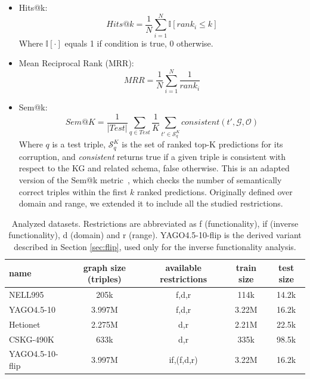 \documentclass[a4paper,UKenglish,cleveref, autoref, thm-restate]{tgdk-v2021}
\begin{document}
\begin{itemize}
    \item Hits@k: 
    \[
    \textit{Hits@}k = \frac{1}{N} \sum_{i=1}^{N} \mathbb{I} \left[ \textit{rank}_i \leq k \right]
    \]
    Where $\mathbb{I}[\cdot]$ equals 1 if condition is true, 0 otherwise.
    \item Mean Reciprocal Rank (MRR): 
    \[
    \textit{MRR} = \frac{1}{N} \sum_{i=1}^{N} \frac{1}{\textit{rank}_i}
    \]
     \item Sem@k:
    \[\textit{Sem}@K = \frac{1}{|\textit{Test}|} \sum_{q \in \textit{Test}} \frac{1}{K} \sum_{t' \in \mathcal{S}_q^K} \textit{consistent}(t',\mathcal{G},\mathcal{O})
    \]
    Where $q$ is a test triple, $\mathcal{S}_q^K$ is the set of ranked top-K predictions for its corruption, and \textit{consistent} returns true if a given triple is consistent with respect to the KG and related schema, false otherwise. This is an adapted version of the Sem@k metric~\cite{hubert_treat_2024}, which checks the number of semantically correct triples within the first $k$ ranked predictions. Originally defined over domain and range, we extended it to include all the studied restrictions.
\end{itemize}




\begin{table}[]
    \centering
    \caption{Analyzed datasets. Restrictions are abbreviated as f (functionality), if (inverse functionality), d (domain) and r (range). YAGO4.5-10-flip is the derived variant described in Section \ref{sec:flip}, used only for the inverse functionality analysis.}
    \begin{tabular}{l|c|c|c|c}
         name & graph size (triples) & available restrictions & train size & test size \\
         \hline
         NELL995 & 205k & f,d,r & 114k & 14.2k \\
         YAGO4.5-10 & 3.997M & f,d,r & 3.22M & 16.2k\\
         Hetionet & 2.275M & d,r & 2.21M & 22.5k \\
         CSKG-490K & 633k & d,r & 335k & 98.5k \\
         YAGO4.5-10-flip & 3.997M & if,(f,d,r) & 3.22M & 16.2k \\
    \end{tabular}
    \label{tab:datasets}
\end{table}

\end{document}
